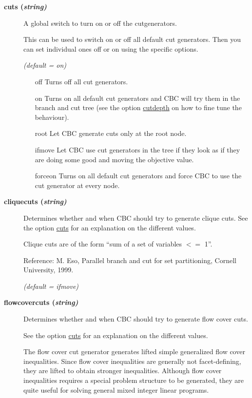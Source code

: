\begin{description}
\item[\label{cuts}\hypertarget{cuts}
{\textbf{cuts (\slshape{string})}}]\hspace{1.0in}

A global switch to turn on or off the cutgenerators.

This can be used to switch on or off all default cut generators.
Then you can set individual ones off or on using the specific options.

\textsl{(default = on)}
\begin{itemize}
\item[off] 
Turns off all cut generators.
\item[on] 
Turns on all default cut generators and CBC will try them in the branch and cut tree (see the option \hyperlink{cutdepth}{cutdepth} on how to fine tune the behaviour).
\item[root] 
Let CBC generate cuts only at the root node.
\item[ifmove] 
Let CBC use cut generators in the tree if they look as if they are doing some good and moving the objective value.
\item[forceon] 
Turns on all default cut generators and force CBC to use the cut generator at every node.
\end{itemize}

\item[\label{cliquecuts}\hypertarget{cliquecuts}
{\textbf{cliquecuts (\slshape{string})}}]\hspace{1.0in}

Determines whether and when CBC should try to generate clique cuts.
See the option \hyperlink{cuts}{cuts} for an explanation on the different values.

Clique cuts are of the form ``sum of a set of variables $<=$ 1''.

Reference: M. Eso, Parallel branch and cut for set partitioning, Cornell University, 1999.

\textsl{(default = ifmove)}

\item[\label{flowcovercuts}\hypertarget{flowcovercuts}
{\textbf{flowcovercuts (\slshape{string})}}]\hspace{1.0in}

Determines whether and when CBC should try to generate flow cover cuts.

See the option \hyperlink{cuts}{cuts} for an explanation on the different values.

The flow cover cut generator generates lifted simple generalized flow cover inequalities.
Since flow cover inequalities are generally not facet-defining, they are lifted to obtain stronger inequalities.
Although flow cover inequalities requires a special problem structure to be generated, they are quite useful for solving general mixed integer linear programs.


\end{description}
